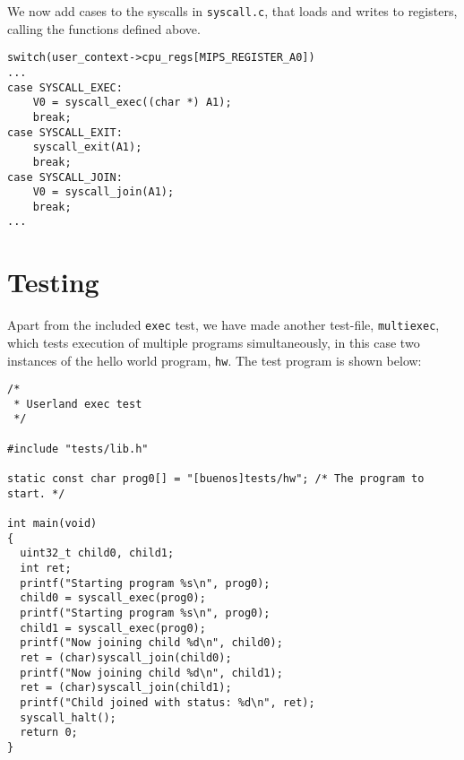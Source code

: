 \documentclass[a4paper,12pt]{article}
\begin{document}
We now add cases to the syscalls in \texttt{syscall.c}, that loads and writes to registers, calling the functions defined above.
\begin{lstlisting}
switch(user_context->cpu_regs[MIPS_REGISTER_A0])
...
case SYSCALL_EXEC:
    V0 = syscall_exec((char *) A1);
    break;
case SYSCALL_EXIT:
    syscall_exit(A1);
    break;
case SYSCALL_JOIN:
    V0 = syscall_join(A1);
    break;
...
\end{lstlisting}

\section{Testing}
Apart from the included \texttt{exec} test, we have made another test-file, \texttt{multiexec}, which tests execution of multiple programs simultaneously, in this case two instances of the hello world program, \texttt{hw}. The test program is shown below:

\begin{lstlisting}
/*
 * Userland exec test
 */

#include "tests/lib.h"

static const char prog0[] = "[buenos]tests/hw"; /* The program to start. */

int main(void)
{
  uint32_t child0, child1;
  int ret;
  printf("Starting program %s\n", prog0);
  child0 = syscall_exec(prog0);
  printf("Starting program %s\n", prog0);
  child1 = syscall_exec(prog0);
  printf("Now joining child %d\n", child0);
  ret = (char)syscall_join(child0); 
  printf("Now joining child %d\n", child1);
  ret = (char)syscall_join(child1);
  printf("Child joined with status: %d\n", ret);
  syscall_halt();
  return 0;
}
\end{lstlisting}
\end{document}
